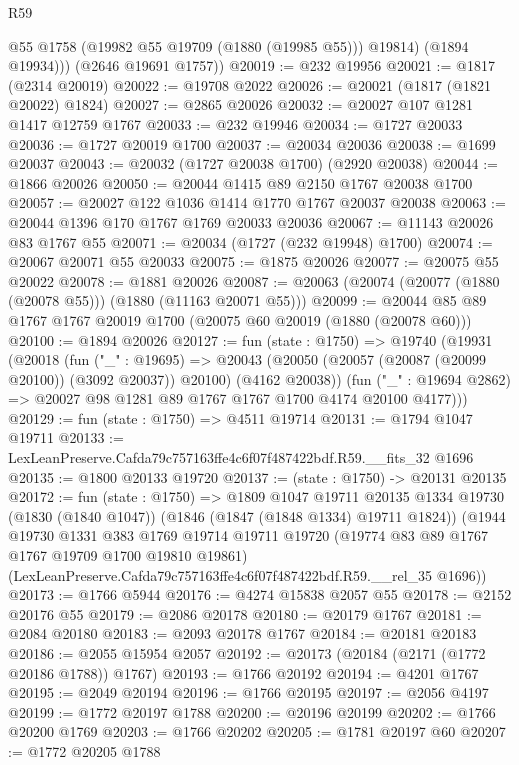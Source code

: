 \begin{lexlean}{R59}
\begin{coremodule}
            @55
            @1758
            (@19982 @55 @19709 (@1880 (@19985 @55)))
            @19814)
          (@1894 @19934)))
      (@2646 @19691 @1757))
@20019 := @232 @19956
@20021 := @1817 (@2314 @20019)
@20022 := @19708 @2022
@20026 := @20021 (@1817 (@1821 @20022) @1824)
@20027 := @2865 @20026
@20032 := @20027 @107 @1281 @1417 @12759 @1767
@20033 := @232 @19946
@20034 := @1727 @20033
@20036 := @1727 @20019 @1700
@20037 := @20034 @20036
@20038 := @1699 @20037
@20043 := @20032 (@1727 @20038 @1700) (@2920 @20038)
@20044 := @1866 @20026
@20050 := @20044 @1415 @89 @2150 @1767 @20038 @1700
@20057 := @20027 @122 @1036 @1414 @1770 @1767 @20037 @20038
@20063 := @20044 @1396 @170 @1767 @1769 @20033 @20036
@20067 := @11143 @20026 @83 @1767 @55
@20071 := @20034 (@1727 (@232 @19948) @1700)
@20074 := @20067 @20071 @55 @20033
@20075 := @1875 @20026
@20077 := @20075 @55 @20022
@20078 := @1881 @20026
@20087 := @20063 (@20074 (@20077 (@1880 (@20078 @55))) (@1880 (@11163 @20071 @55)))
@20099 := @20044 @85 @89 @1767 @1767 @20019 @1700 (@20075 @60 @20019 (@1880 (@20078 @60)))
@20100 := @1894 @20026
@20127 := fun (state : @1750) =>
  @19740
    (@19931
      (@20018
        (fun ("_" : @19695) =>
        @20043 (@20050 (@20057 (@20087 (@20099 @20100)) (@3092 @20037)) @20100) (@4162 @20038))
        (fun ("_" : @19694 @2862) => @20027 @98 @1281 @89 @1767 @1767 @1700 @4174 @20100 @4177)))
@20129 := fun (state : @1750) => @4511 @19714
@20131 := @1794 @1047 @19711
@20133 := LexLeanPreserve.Cafda79c757163ffe4c6f07f487422bdf.R59.__fits_32 @1696
@20135 := @1800 @20133 @19720
@20137 := (state : @1750) -> @20131 @20135
@20172 := fun (state : @1750) =>
  @1809
    @1047
    @19711
    @20135
    @1334
    @19730
    (@1830 (@1840 @1047))
    (@1846 (@1847 (@1848 @1334) @19711 @1824))
    (@1944
      @19730
      @1331
      @383
      @1769
      @19714
      @19711
      @19720
      (@19774 @83 @89 @1767 @1767 @19709 @1700 @19810 @19861)
      (LexLeanPreserve.Cafda79c757163ffe4c6f07f487422bdf.R59.__rel_35 @1696))
@20173 := @1766 @5944
@20176 := @4274 @15838 @2057 @55
@20178 := @2152 @20176 @55
@20179 := @2086 @20178
@20180 := @20179 @1767
@20181 := @2084 @20180
@20183 := @2093 @20178 @1767
@20184 := @20181 @20183
@20186 := @2055 @15954 @2057
@20192 := @20173 (@20184 (@2171 (@1772 @20186 @1788)) @1767)
@20193 := @1766 @20192
@20194 := @4201 @1767
@20195 := @2049 @20194
@20196 := @1766 @20195
@20197 := @2056 @4197
@20199 := @1772 @20197 @1788
@20200 := @20196 @20199
@20202 := @1766 @20200 @1769
@20203 := @1766 @20202
@20205 := @1781 @20197 @60
@20207 := @1772 @20205 @1788

\end{coremodule}
\end{lexlean}
